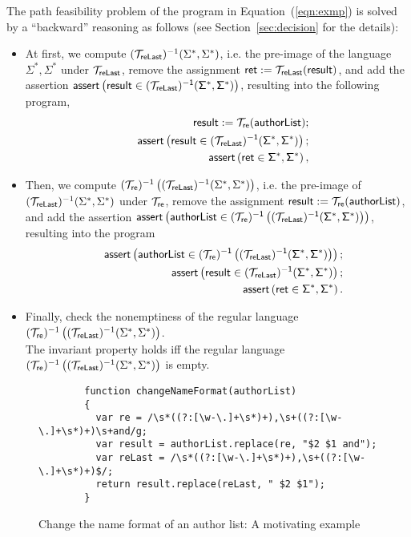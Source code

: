 The path feasibility problem of the program in Equation~(\ref{eqn:exmp}) is solved by a ``backward'' reasoning as follows (see Section~\ref{sec:decision} for the details):  
\begin{itemize}
\item At first, we compute $(\mathcal{T}_{\sf reLast})^{-1}(\Sigma^*, \Sigma^*)$,  i.e. the pre-image of the language $\Sigma^*, \Sigma^*$ under $\mathcal{T}_{\sf reLast}$,  remove the assignment $\sf  ret : = \mathcal{T}_{reLast}(result)$, and add the assertion $\textsf{assert}\left(\sf result \in (\mathcal{T}_{\sf reLast})^{-1}(\Sigma^*, \Sigma^*)\right)$, resulting into the following program,
\begin{eqnarray}
& & \sf result  := \sf  \mathcal{T}_{ re}(authorList); \nonumber\\
& & \textsf{assert}\left(\sf result \in (\mathcal{T}_{\sf reLast})^{-1}(\Sigma^*, \Sigma^*)\right); \nonumber\\
& & \sf \textsf{assert}\left(ret \in \Sigma^*, \Sigma^*\right),
\end{eqnarray}

%
\item Then, we compute $(\mathcal{T}_{\sf re})^{-1}\left((\mathcal{T}_{\sf reLast})^{-1}(\Sigma^*, \Sigma^*)\right)$, i.e. the pre-image of $(\mathcal{T}_{\sf reLast})^{-1}(\Sigma^*, \Sigma^*)$ under $\mathcal{T}_{\sf re}$, remove the assignment $ \sf result  := \sf  \mathcal{T}_{ re}(authorList)$, and add the assertion $\textsf{assert}\left(\sf authorList \in (\mathcal{T}_{ re})^{-1}\left((\mathcal{T}_{\sf reLast})^{-1}(\Sigma^*, \Sigma^*)\right)\right)$, resulting into the program 
\begin{eqnarray}\label{eqn:exmp-final}
& & \textsf{assert}\left(\sf authorList \in (\mathcal{T}_{ re})^{-1}\left((\mathcal{T}_{\sf reLast})^{-1}(\Sigma^*, \Sigma^*)\right)\right); \nonumber\\
& & \textsf{assert}\left(\sf result \in (\mathcal{T}_{\sf reLast})^{-1}(\Sigma^*, \Sigma^*)\right); \nonumber\\
& & \sf \textsf{assert}\left(ret \in \Sigma^*, \Sigma^*\right).
\end{eqnarray}
\item Finally, check the nonemptiness of the regular language $(\mathcal{T}_{\sf re})^{-1}\left((\mathcal{T}_{\sf reLast})^{-1}(\Sigma^*, \Sigma^*)\right)$.\\
The invariant property holds iff the regular language $(\mathcal{T}_{\sf re})^{-1}\left((\mathcal{T}_{\sf reLast})^{-1}(\Sigma^*, \Sigma^*)\right)$ is empty.
\end{itemize}

\begin{figure*}[htbp]
\begin{center}
{
\begin{verbatim}
		function changeNameFormat(authorList)
		{
		  var re = /\s*((?:[\w-\.]+\s*)+),\s+((?:[\w-\.]+\s*)+)\s+and/g;
		  var result = authorList.replace(re, "$2 $1 and");
		  var reLast = /\s*((?:[\w-\.]+\s*)+),\s+((?:[\w-\.]+\s*)+)$/;
		  return result.replace(reLast, " $2 $1");
		}
\end{verbatim}
}
\end{center}
\caption{Change the name format of an author list: A motivating example}
\label{fig-run-exmp}
\end{figure*}
